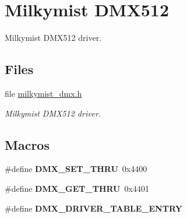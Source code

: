 \hypertarget{group__lm32__milkymist__dmx}{}\section{Milkymist D\+M\+X512}
\label{group__lm32__milkymist__dmx}


Milkymist D\+M\+X512 driver.  


\subsection*{Files}
\begin{DoxyCompactItemize}
\item 
file \mbox{\hyperlink{milkymist__dmx_8h}{milkymist\+\_\+dmx.\+h}}
\begin{DoxyCompactList}\small\item\em Milkymist D\+M\+X512 driver. \end{DoxyCompactList}\end{DoxyCompactItemize}
\subsection*{Macros}
\begin{DoxyCompactItemize}
\item 
\mbox{\label{group__lm32__milkymist__dmx_ga5bb6df140356534c5ffac0814e16e1c5}} 
\#define {\bfseries D\+M\+X\+\_\+\+S\+E\+T\+\_\+\+T\+H\+RU}~0x4400
\item 
\mbox{\label{group__lm32__milkymist__dmx_gadd6a2306c175a251824211cf2308d60d}} 
\#define {\bfseries D\+M\+X\+\_\+\+G\+E\+T\+\_\+\+T\+H\+RU}~0x4401
\item 
\#define {\bfseries D\+M\+X\+\_\+\+D\+R\+I\+V\+E\+R\+\_\+\+T\+A\+B\+L\+E\+\_\+\+E\+N\+T\+RY}
\end{DoxyCompactItemize}
